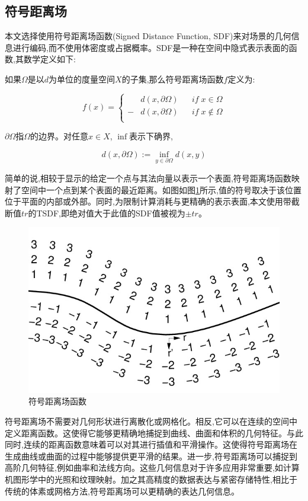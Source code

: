 \subsection{符号距离场}
本文选择使用符号距离场函数\cite{sdf}(Signed Distance Function, SDF)来对场景的几何信息进行编码,而不使用体密度或占据概率。SDF是一种在空间中隐式表示表面的函数,其数学定义如下:

如果$\Omega$是以$d$为单位的度量空间$X$的子集,那么符号距离场函数$f$定义为:

$$f(x) = \left\{
\begin{aligned}
&d(x,\partial\Omega)&&if\; x\in\Omega \\
-&d(x,\partial\Omega)&&if\; x\notin\Omega\\
\end{aligned}
\right.
$$

$\partial\Omega$指$\Omega$的边界。对任意$x\in X$, $\inf$表示下确界,

$$
d(x,\partial\Omega) := \inf_{y\in \partial\Omega}d(x,y)
$$

简单的说,相较于显示的给定一个点与其法向量以表示一个表面,符号距离场函数映射了空间中一个点到某个表面的最近距离。如图如图\ref{sdf_figure}所示,值的符号取决于该位置位于平面的内部或外部。同时,为限制计算消耗与更精确的表示表面,本文使用带截断值$tr$的TSDF,即绝对值大于此值的SDF值被视为$\pm tr$。
\begin{figure}[htbp]
    \centering
    \includegraphics[scale=0.3]{figures/sdf_figure.jpeg}
    \caption{符号距离场函数}\label{sdf_figure}
\end{figure}

符号距离场不需要对几何形状进行离散化或网格化。相反,它可以在连续的空间中定义距离函数。这使得它能够更精确地捕捉到曲线、曲面和体积的几何特征。与此同时,连续的距离函数意味着可以对其进行插值和平滑操作。这使得符号距离场在生成曲线或曲面的过程中能够提供更平滑的结果。进一步,符号距离场可以捕捉到高阶几何特征,例如曲率和法线方向。这些几何信息对于许多应用非常重要,如计算机图形学中的光照和纹理映射。加之其高精度的数据表达与紧密存储特性,相比于传统的体素或网格方法,符号距离场可以更精确的表达几何信息。
